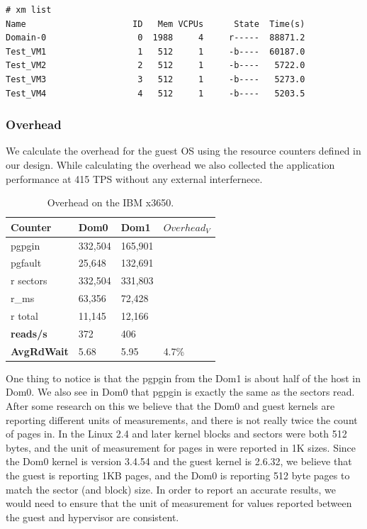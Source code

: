 \begin{Verbatim}
# xm list
Name                     ID   Mem VCPUs      State  Time(s)
Domain-0                  0  1988     4     r-----  88871.2
Test_VM1                  1   512     1     -b----  60187.0
Test_VM2                  2   512     1     -b----   5722.0
Test_VM3                  3   512     1     -b----   5273.0
Test_VM4                  4   512     1     -b----   5203.5
\end{Verbatim}

\subsubsection{Overhead}
We calculate the overhead for the guest OS using the resource counters defined in our design.  While calculating the overhead we also collected the application performance at 415 TPS without any external interfernece.

\begin{table}[h]
\begin{tabular}{ l l l p{5cm} }
  Counter     & Dom0 & Dom1 & $Overhead_V$ \\
  \hline
	pgpgin    & 332,504 & 165,901  &  \\
	pgfault   &  25,648 & 132,691  & \\
	r sectors & 332,504 & 331,803  &\\
	r\_ms     &  63,356 &  72,428  & \\
	r total   &  11,145 &  12,166  & \\
    \textbf{reads/s}    & 372 & 406 & \\
    \textbf{AvgRdWait}  & 5.68 & 5.95 & 4.7\% \\ 
  \hline
\end{tabular}
\caption{Overhead on the IBM x3650.}
\label{tab:OverheadSmall}
\end{table}

One thing to notice is that the pgpgin from the Dom1 is about half of the host in Dom0.  
We also see in Dom0 that pgpgin is exactly the same as the sectors read.  
After some research on this we believe that the Dom0 and guest kernels are reporting different units of measurements, and there is not really twice the count of pages in. 
In the Linux 2.4 and later kernel blocks and sectors were both 512 bytes, and the unit of measurement for pages in were reported in 1K sizes.  Since the Dom0 kernel is version 3.4.54 and the guest kernel is 2.6.32, we believe that the guest is reporting 1KB pages, and the Dom0 is reporting 512 byte pages to match the sector (and block) size.  In order to report an accurate results, we would need to ensure that the unit of measurement for values reported between the guest and hypervisor are consistent.  

